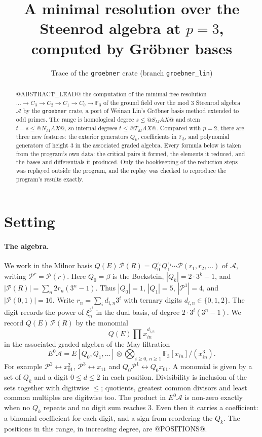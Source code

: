 \documentclass[11pt]{article}
\title{A minimal resolution over the Steenrod algebra at $p = 3$,\\ computed by Gröbner bases}
\author{Trace of the \texttt{groebner} crate (branch \texttt{groebner\_lin})}
\date{}
\renewcommand{\P}{\mathcal{P}}
\newcommand{\F}{\mathbb{F}_3}
\newcommand{\A}{\mathcal{A}}
\begin{document}
\maketitle

\begin{abstract}
@ABSTRACT_LEAD@ the computation of the minimal free resolution
$\dots \to C_3 \to C_2 \to C_1 \to C_0 \to \F$ of the ground field over the mod $3$ Steenrod
algebra $\A$ by the \texttt{groebner} crate, a port of Weinan Lin's Gröbner basis method
extended to odd primes. The range is homological degree $s \le @S_MAX@$ and stem $t - s \le @N_MAX@$, so
internal degrees $t \le @T_MAX@$. Compared with $p = 2$, there are three new features: the exterior
generators $Q_k$, coefficients in $\F$, and polynomial generators of height $3$ in the
associated graded algebra. Every formula below is taken from the program's own data: the
critical pairs it formed, the elements it reduced, and the bases and differentials it
produced. Only the bookkeeping of the reduction steps was replayed outside the program, and the
replay was checked to reproduce the program's results exactly.
\end{abstract}

\section{Setting}

\paragraph{The algebra.}
We work in the Milnor basis $Q(E)\,\P(R) = Q_0^{\epsilon_0}Q_1^{\epsilon_1}\cdots
\P(r_1, r_2, \dots)$ of $\A$, writing $\P^r = \P(r)$. Here $Q_0 = \beta$ is the Bockstein,
$|Q_k| = 2\cdot 3^k - 1$, and $|\P(R)| = \sum_n 2 r_n (3^n - 1)$. Thus $|Q_0| = 1$, $|Q_1| = 5$,
$|\P^1| = 4$, and $|\P(0,1)| = 16$. Write $r_n = \sum_i d_{i,n} 3^i$ with ternary digits
$d_{i,n} \in \{0, 1, 2\}$. The digit records the power of $\xi_n^{3^i}$ in the dual basis,
of degree $2\cdot 3^i(3^n - 1)$. We record $Q(E)\,\P(R)$ by the monomial
\[ Q(E) \prod x_{in}^{d_{i,n}} \]
in the associated graded algebra of the May filtration
\[ E^0\A = E[Q_0, Q_1, \dots] \otimes \bigotimes_{i \ge 0,\, n \ge 1} \F[x_{in}]/(x_{in}^3). \]
For example $\P^2 \leftrightarrow x_{01}^2$, $\P^3 \leftrightarrow x_{11}$ and
$Q_0\P^1 \leftrightarrow Q_0x_{01}$. A monomial is given by a set of $Q_k$ and a digit
$0 \le d \le 2$ in each position. Divisibility is inclusion of the sets together with digitwise
$\le$; quotients, greatest common divisors and least common multiples are digitwise too. The
product in $E^0\A$ is non-zero exactly when no $Q_k$ repeats and no digit sum reaches $3$. Even
then it carries a coefficient: a binomial coefficient for each digit, and a sign from
reordering the $Q_k$. The positions in this range, in increasing degree, are @POSITIONS@.
\end{document}
